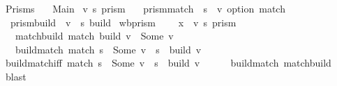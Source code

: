 %
\begin{isabellebody}%
%
%
\isamarkuptrue%
%
\isadelimtheory
%
\endisadelimtheory
%
\isatagtheory
{}\isamarkupfalse%
\ Prisms\isanewline
\ \ \ Main\isanewline
{}%
\endisatagtheory
{\isafoldtheory}%
%
\isadelimtheory
%
\endisadelimtheory
\isanewline
\isanewline
{}\isamarkupfalse%
\ {\isacharparenleft}{\isacharprime}v{\isacharcomma}\ {\isacharprime}s{\isacharparenright}\ prism\ {\isacharequal}\isanewline
\ \ prism{\isacharunderscore}match\ {\isacharcolon}{\isacharcolon}\ {\isachardoublequoteopen}{\isacharprime}s\ {\isasymRightarrow}\ {\isacharprime}v\ option{\isachardoublequoteclose}\ {\isacharparenleft}{\isachardoublequoteopen}match{\isasymindex}{\isachardoublequoteclose}{\isacharparenright}\isanewline
\ \ prism{\isacharunderscore}build\ {\isacharcolon}{\isacharcolon}\ {\isachardoublequoteopen}{\isacharprime}v\ {\isasymRightarrow}\ {\isacharprime}s{\isachardoublequoteclose}\ {\isacharparenleft}{\isachardoublequoteopen}build{\isasymindex}{\isachardoublequoteclose}{\isacharparenright}\isanewline
\isanewline
{}\isamarkupfalse%
\ wb{\isacharunderscore}prism\ {\isacharequal}\isanewline
\ \ \ x\ {\isacharcolon}{\isacharcolon}\ {\isachardoublequoteopen}{\isacharparenleft}{\isacharprime}v{\isacharcomma}\ {\isacharprime}s{\isacharparenright}\ prism{\isachardoublequoteclose}\ {\isacharparenleft}\isanewline
\ \ \ match{\isacharunderscore}build{\isacharcolon}\ {\isachardoublequoteopen}match\ {\isacharparenleft}build\ v{\isacharparenright}\ {\isacharequal}\ Some\ v{\isachardoublequoteclose}\isanewline
\ \ \ build{\isacharunderscore}match{\isacharcolon}\ {\isachardoublequoteopen}match\ s\ {\isacharequal}\ Some\ v\ {\isasymLongrightarrow}\ s\ {\isacharequal}\ build\ v{\isachardoublequoteclose}\isanewline
{}\isanewline
\ \ \isanewline
\ \ \isamarkupfalse%
\ build{\isacharunderscore}match{\isacharunderscore}iff{\isacharcolon}\ {\isachardoublequoteopen}match\ s\ {\isacharequal}\ Some\ v\ {\isasymlongleftrightarrow}\ s\ {\isacharequal}\ build\ v{\isachardoublequoteclose}\isanewline
%
\isadelimproof
\ \ \ \ %
\endisadelimproof
%
\isatagproof
{}\isamarkupfalse%
\ build{\isacharunderscore}match\ match{\isacharunderscore}build\ \isamarkupfalse%
\ blast%
\endisatagproof
{\isafoldproof}%
%
\isadelimproof
\isanewline
%
\endisadelimproof
\ \ \ \ \ \ \isanewline

\end{isabellebody}
